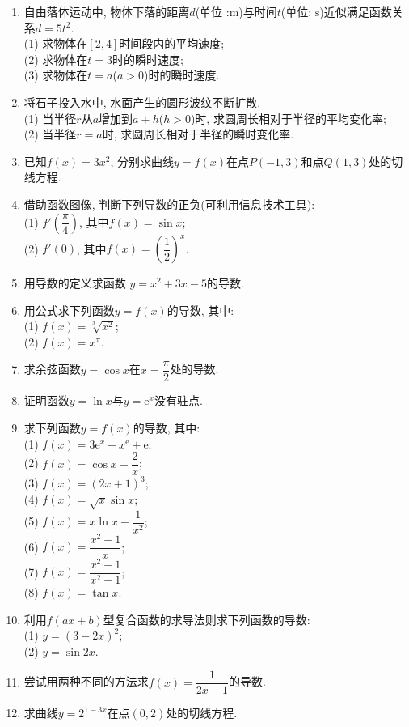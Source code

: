 \documentclass[10pt,a4paper]{article}
\begin{document}
\begin{enumerate}[1.]
\item 自由落体运动中, 物体下落的距离$d$(单位 :$\text{m}$)与时间$t$(单位: $\text{s}$)近似满足函数关系$d=5t^2$.\\
(1) 求物体在$[2, 4]$时间段内的平均速度;\\
(2) 求物体在$t=3$时的瞬时速度;\\
(3) 求物体在$t=a$($a>0$)时的瞬时速度.
\item 将石子投入水中, 水面产生的圆形波纹不断扩散.\\
(1) 当半径$r$从$a$增加到$a+h$($h>0$)时, 求圆周长相对于半径的平均变化率;\\
(2) 当半径$r=a$时, 求圆周长相对于半径的瞬时变化率. 
\item 已知$f(x)=3x^2$, 分别求曲线$y=f(x)$在点$P(-1,3)$和点$Q(1,3)$处的切线方程.
\item 借助函数图像, 判断下列导数的正负(可利用信息技术工具):\\
(1) $f'(\dfrac\pi 4)$, 其中$f(x)=\sin x$;\\
(2) $f'(0)$, 其中$f(x)=(\dfrac 12)^x$. 
\item 用导数的定义求函数 $y=x^2+3x-5$的导数.
\item 用公式求下列函数$y=f(x)$的导数, 其中:\\
(1) $f(x)=\sqrt[3]{x^2}$;\\
(2) $f(x)=x^\pi$.
\item 求余弦函数$y=\cos x$在$x=\dfrac \pi2$处的导数.
\item 证明函数$y=\ln x$与$y=\mathrm{e}^x$没有驻点. 
\item 求下列函数$y=f(x)$的导数, 其中:\\
(1) $f(x)=3\mathrm{e}^x-x^{\mathrm{e}}+\mathrm{e}$;\\
(2) $f(x)=\cos x-\dfrac 2x$;\\
(3) $f(x)=(2x+1)^3$;\\
(4) $f(x)=\sqrt x\sin x$;\\
(5) $f(x)=x\ln x-\dfrac1{x^2}$;\\
(6) $f(x)=\dfrac{x^2-1}x$;\\
(7) $f(x)=\dfrac{x^2-1}{x^2+1}$;\\
(8) $f(x)=\tan x$. 
\item 利用$f(ax+b)$型复合函数的求导法则求下列函数的导数:\\
(1) $y=(3-2x)^2$;\\
(2) $y=\sin 2x$.
\item 尝试用两种不同的方法求$f(x)=\dfrac1{2x-1}$的导数.
\item 求曲线$y=2^{1-3x}$在点$(0,2)$处的切线方程.

\end{enumerate}
\end{document}
